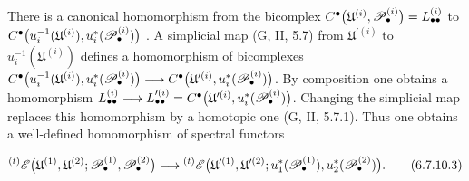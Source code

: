 \begin{env}[6.7.10]
There is a canonical homomorphism from the bicomplex $C^\bullet
\bigl(
\mathfrak U^{(i)},\mathscr{P}_\bullet^{(i)}
\bigr)
=
L_{\bullet\bullet}^{(i)}$
to $C^\bullet
\bigl(
u_i^{-1}(\mathfrak U^{(i)}),
u_i^*(\mathscr{P}_\bullet^{(i)})
\bigr)$
.  A simplicial map
\textnormal{(G, II, 5.7)} from $\mathfrak U^{\prime(i)}$ to
$u_i^{-1}(\mathfrak U^{(i)})$ defines a homomorphism of
bicomplexes $C^\bullet
\bigl(
u_i^{-1}(\mathfrak U^{(i)}),
u_i^*(\mathscr{P}_\bullet^{(i)})
\bigr)
\longrightarrow
C^\bullet
\bigl(
\mathfrak U^{\prime(i)},
u_i^*(\mathscr{P}_\bullet^{(i)})
\bigr)$.
By composition one obtains a homomorphism $L_{\bullet\bullet}^{(i)}
\longrightarrow
L_{\bullet\bullet}^{\prime(i)}
=
C^\bullet
\bigl(
\mathfrak U^{\prime(i)},
u_i^*(\mathscr{P}_\bullet^{(i)})
\bigr)$.
Changing the simplicial map replaces this homomorphism by a
homotopic one \textnormal{(G, II, 5.7.1)}.  Thus one obtains a
well-defined homomorphism of spectral functors
\begin{env}[6.7.10.3]
\label{III.6.7.10.3}
\[
  {}^{(t)}\mathscr{E}
  \bigl(
    \mathfrak U^{(1)},\mathfrak U^{(2)};
    \mathscr{P}_\bullet^{(1)},\mathscr{P}_\bullet^{(2)}
  \bigr)
  \longrightarrow
  {}^{(t)}\mathscr{E}
  \bigl(
    \mathfrak U^{\prime(1)},\mathfrak U^{\prime(2)};
    u_1^*(\mathscr{P}_\bullet^{(1)}),
    u_2^*(\mathscr{P}_\bullet^{(2)})
  \bigr).
  \tag{6.7.10.3}\label{III.6.7.10.3.eq}
\]
\end{env}


\end{env}
